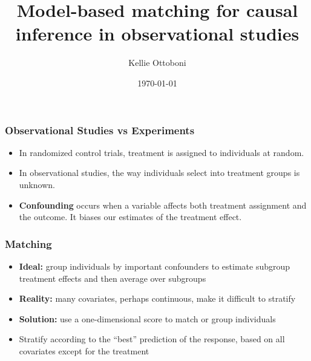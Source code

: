 \documentclass{beamer}
\title[Model-based matching]{Model-based matching for causal inference in observational studies}
\author{Kellie Ottoboni}
\institute[]{Department of Statistics, UC Berkeley \\ Berkeley Institute for Data Science}
\date{\today}
\begin{document}
\frame{\titlepage}

\frame
{
  \frametitle{Observational Studies vs Experiments}
 \begin{center}
\begin{itemize}
\item In randomized control trials, treatment is assigned to individuals at random.
\item In observational studies, the way individuals select into treatment groups is unknown.
\item \textbf{Confounding} occurs when a variable affects both treatment assignment and the outcome. It biases our estimates of the treatment effect.
\end{itemize}
\end{center}
}


\frame
{
  \frametitle{Matching}
\begin{center}
\begin{itemize}
\item \textbf{Ideal:} group individuals by important confounders to estimate subgroup treatment effects and then average over subgroups
\item \textbf{Reality:} many covariates, perhaps continuous, make it difficult to stratify
\item \textbf{Solution:} use a one-dimensional score to match or group individuals
\item  Stratify according to the ``best'' prediction of the response, based on all covariates except for the treatment
\end{itemize}
\end{center}
}
\end{document}
